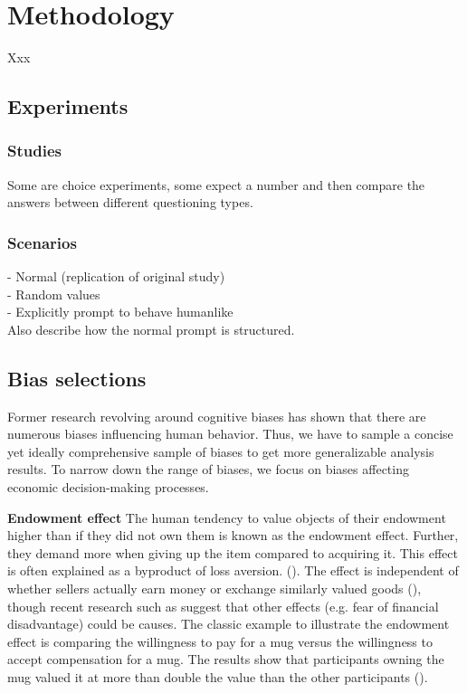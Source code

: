 \section{Methodology}
Xxx

\subsection{Experiments}
\subsubsection{Studies}
Some are choice experiments, some expect a number and then compare the answers between different questioning types.

\subsubsection{Scenarios}
- Normal (replication of original study) \\
- Random values \\
- Explicitly prompt to behave humanlike \\

Also describe how the normal prompt is structured.


\subsection{Bias selections}
\par Former research revolving around cognitive biases has shown that there are numerous biases influencing human behavior. Thus, we have to sample a concise yet ideally comprehensive sample of biases to get more generalizable analysis results. To narrow down the range of biases, we focus on biases affecting economic decision-making processes.

\setlength{\parindent}{20pt}
\par \textbf{Endowment effect} The human tendency to value objects of their endowment higher than if they did not own them is known as the endowment effect. Further, they demand more when giving up the item compared to acquiring it. This effect is often explained as a byproduct of loss aversion. (\cite{kahneman1990experimental}). The effect is independent of whether sellers actually earn money or exchange similarly valued goods (\cite{knetsch1989endowment}), though recent research such as \cite{weaver2012reference} suggest that other effects (e.g. fear of financial disadvantage) could be causes. The classic example to illustrate the endowment effect is comparing the willingness to pay for a mug versus the willingness to accept compensation for a mug. The results show that participants owning the mug valued it at more than double the value than the other participants (\cite{kahneman1990experimental}).

